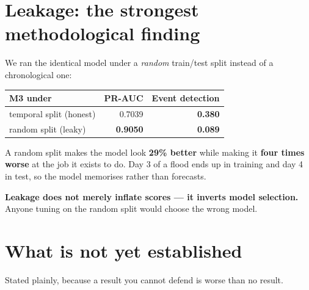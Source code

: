 \documentclass[11pt,a4paper]{article}
\newcommand{\good}[1]{\textcolor{green!45!black}{\textbf{#1}}}
\newcommand{\bad}[1]{\textcolor{red!65!black}{\textbf{#1}}}
\begin{document}
\section{Leakage: the strongest methodological finding}
\label{sec:leakage}

We ran the identical model under a \emph{random} train/test split instead of a
chronological one:

\begin{center}
\small
\begin{tabular}{@{}lrr@{}}
\toprule
M3 under & \textbf{PR-AUC} & \textbf{Event detection} \\
\midrule
temporal split (honest) & 0.7039 & \good{0.380} \\
random split (leaky) & \bad{0.9050} & \bad{0.089} \\
\bottomrule
\end{tabular}
\end{center}

\noindent
A random split makes the model look \textbf{29\% better} while making it
\textbf{four times worse} at the job it exists to do. Day 3 of a flood ends up in
training and day 4 in test, so the model memorises rather than forecasts.

\textbf{Leakage does not merely inflate scores --- it inverts model selection.}
Anyone tuning on the random split would choose the wrong model.

\section{What is not yet established}
\label{sec:caveats}

Stated plainly, because a result you cannot defend is worse than no result.
\end{document}
